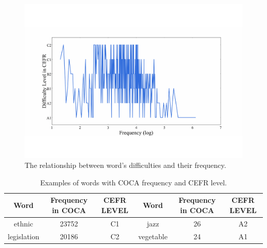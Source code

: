 \begin{figure}[th]
	\centering
	\setlength{\abovecaptionskip}{0pt}
	\setlength{\belowcaptionskip}{0pt}
	\includegraphics[width=0.45\linewidth]{pic/example.pdf}  
	\caption{\label{tab:freqeg} The relationship between word's difficulties and their frequency.}
	\label{fig:freqeg}
\end{figure}

\begin{table}[th]
	\scriptsize
	\setlength{\abovecaptionskip}{0pt}
	\setlength{\belowcaptionskip}{0pt}
\begin{center}
		\begin{tabular}{ccc|ccc}
		\toprule
		\textbf{Word} & \textbf{Frequency in COCA} & \textbf{CEFR LEVEL} & \textbf{Word} & \textbf{Frequency in COCA} & \textbf{CEFR LEVEL} \\ \midrule
		ethnic & 23752 & C1 & jazz & 26 &A2 \\ 
		legislation & 20186 &C2 & vegetable& 24&A1 \\ \bottomrule 
	\end{tabular}
\end{center}
\caption{\label{tab:words} Examples of words with COCA frequency and CEFR level.}
\end{table}

